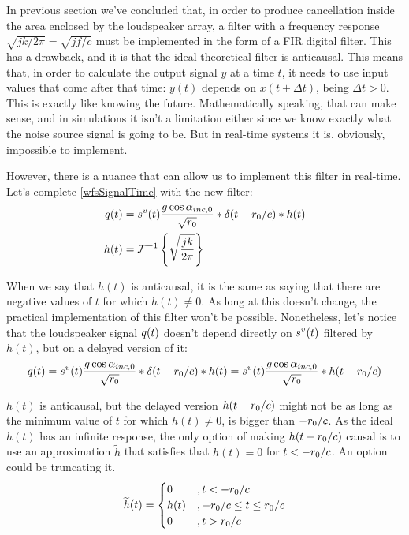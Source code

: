 In previous section we've concluded that, in order to produce cancellation inside the area enclosed by the loudspeaker array, a filter with a frequency response $\sqrt{jk/2\pi} = \sqrt{jf/c}$ must be implemented in the form of a FIR digital filter. This has a drawback, and it is that the ideal theoretical filter is anticausal. This means that, in order to calculate the output signal $y$ at a time $t$, it needs to use input values that come after that time: $y(t)$ depends on $x(t+\Delta t)$, being $\Delta t > 0$. This is exactly like knowing the future. Mathematically speaking, that can make sense, and in simulations it isn't a limitation either since we know exactly what the noise source signal is going to be.
But in real-time systems it is, obviously, impossible to implement.

However, there is a nuance that can allow us to implement this filter in real-time. Let's complete \autoref{wfsSignalTime} with the new filter:
\begin{equation}
\begin{aligned}
\signal[wfs][time](t) &= \signal[nsVirt][time](t) \frac{g \cos\normPrimaryPropAngleSection}{\sqrt{\distLinePrimSource}}
\ast\delta(t - \distLinePrimSource/c)\ast h(t) \\
h(t) &= \FourierTransform{\sqrt{\frac{jk}{2\pi}}}[inverse]
\end{aligned}
\end{equation}

When we say that $h(t)$ is anticausal, it is the same as saying that there are negative values of $t$ for which $h(t) \neq 0$. As long at this doesn't change, the practical implementation of this filter won't be possible. Nonetheless, let's notice that the loudspeaker signal $\signal[wfs][time](t)$ doesn't depend directly on $\signal[nsVirt][time](t)$ filtered by $h(t)$, but on a delayed version of it:
\begin{equation}
\signal[wfs][time](t) = \signal[nsVirt][time](t) \frac{g \cos\normPrimaryPropAngleSection}{\sqrt{\distLinePrimSource}}
\ast\delta(t - \distLinePrimSource/c)\ast h(t) = \signal[nsVirt][time](t) \frac{g \cos\normPrimaryPropAngleSection}{\sqrt{\distLinePrimSource}}
\ast h(t - \distLinePrimSource/c)
\end{equation}

$h(t)$ is anticausal, but the delayed version $h(t - r_0/c)$ might not be as long as the minimum value of $t$ for which $h(t) \neq 0$, is bigger than $-r_0/c$. As the ideal $h(t)$ has an infinite response, the only option of making $h(t - r_0/c)$ causal is to use an approximation $\widetilde{h}$ that satisfies that $h(t) = 0$ for $t < -r_0/c$. An option could be truncating it. 
\begin{equation}
\widetilde{h}(t) = \begin{cases}
0 & ,t < -r_0/c \\
h(t) & ,-r_0/c \leq t \leq r_0/c \\
0 & ,t > r_0/c
\end{cases}
\end{equation}


